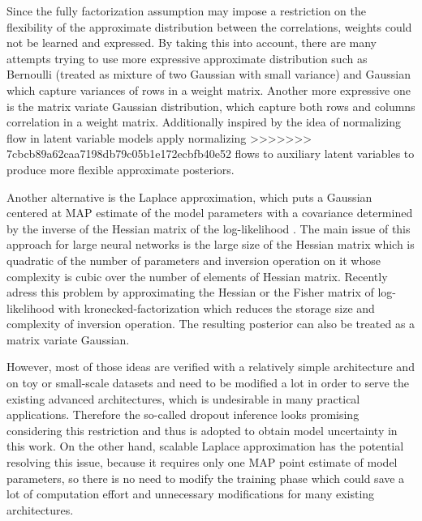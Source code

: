 Since the fully factorization assumption may impose a restriction on the flexibility of the approximate distribution between the correlations, weights could not be learned and expressed. By taking this into account, there are many attempts trying to use more expressive approximate distribution such as Bernoulli (treated as mixture of two Gaussian with small variance)\cite{gal2016dropout} and Gaussian \cite{kingma2015variational} which capture variances of rows in a weight matrix. Another more expressive one is the matrix variate Gaussian distribution\cite{louizos2016structured}\cite{sun2017learning}\cite{zhang2017noisy}, which capture both rows and columns correlation in a weight matrix. Additionally inspired by the idea of normalizing flow in latent variable models \cite{louizos2017multiplicative}apply normalizing
>>>>>>> 7cbcb89a62caa7198db79c05b1e172ecbfb40e52
flows to auxiliary latent variables to produce more
flexible approximate posteriors. 


Another alternative is the Laplace approximation\cite{mackay1992practical}, which puts a Gaussian centered at MAP estimate of the model parameters with a covariance determined by the inverse of the Hessian matrix of the log-likelihood . The main issue of this approach for large neural networks is the large size of the Hessian matrix which is quadratic of the number of parameters and inversion operation on it whose complexity is cubic over the number of elements of Hessian matrix. Recently \cite{ritter2018scalable} adress this problem by approximating the Hessian or the Fisher matrix of log-likelihood with kronecked-factorization which reduces the storage size and complexity of inversion operation. The resulting posterior can also be treated as a matrix variate Gaussian.  

However, most of those ideas are verified with a relatively simple architecture and on toy or small-scale datasets and need to be modified a lot in order to serve the existing advanced architectures, which is undesirable in many practical applications. Therefore the so-called dropout inference\cite{gal2016dropout} looks promising considering this restriction and thus is adopted to obtain model uncertainty in this work. On the other hand, scalable Laplace approximation \cite{ritter2018scalable} has the potential resolving this issue, because it requires only one MAP point estimate of model parameters, so there is no need to modify the training phase which could save a lot of computation effort and unnecessary modifications for many existing architectures.

